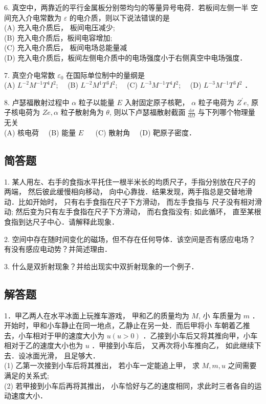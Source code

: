 6. 真空中，两靠近的平行金属板分别带均匀的等量异号电荷．若板间左侧一半 空间充入介电常数为 $\varepsilon$ 的电介质，则以下说法错误的是 \\
(A) 充入电介质后， 板间电压减少;\\
(B) 充入电介质后，板间电容增加;\\
(C) 充入电介质后， 板间电场总能量减\\
(D) 充入电介质后，板间左侧电介质中的电场强度小于右侧真空中电场强度．

7. 真空介电常数 $\varepsilon_{0}$ 在国际单位制中的量纲是\\
(A) $L^{-2} M^{-1} T^{4} I^{2}$;$\quad$
(B) $L^{-2} M^{1} T^{3} I^{2}$;$\quad$
(C) $L^{-3} M^{-1} T^{4} I^{2}$;$\quad$
(D) $L^{-3} M^{-1} T^{3} I^{2}$ ．

8. 卢瑟福散射过程中 $\alpha$ 粒子以能量 $E$ 入射固定原子核靶， $\alpha$ 粒子电荷为 $Z^{\prime} e$, 原子核电荷为 $Z e, \alpha$ 粒子散射角为 $\theta$, 则以下卢瑟福散射截面 $\frac{\mathrm{d} \sigma}{\mathrm{d} \Omega}$ 与下列哪个物理量无关\\
(A) 核电荷$\quad$
(B) 能量 $E$ $\quad$
(C) 散射角$\quad$
(D) 靶原子密度．
\subsection{简答题}
1.  某人用左、右手的食指水平托住一根半米长的均质尺子，手指分别放在尺子的两端， 然后彼此缓慢相向移动， 向中心靠拢．结果发现，两手指总是交替地滑动．比如开始时， 只有右手食指在尺子下方滑动， 而左手食指与 尺子没有相对滑动; 然后变为只有左手食指在尺子下方滑动， 而右食指没有; 如此循环， 直至某根食指到达尺子中心．请解释此现象．

2. 空间中存在随时间变化的磁场，但不存在任何导体．该空间是否有感应电场？有没有感应电动势？并简述理由．

3. 什么是双折射现象？并给出现实中双折射现象的一个例子．
\subsection{解答题}
1．甲乙两人在水平冰面上玩推车游戏， 甲和乙的质量均为 $M$, 小 车质量为 $m$ ．开始时，甲和小车静止在同一地点，乙静止在另一处．而后甲将小 车朝着乙推去，小车相对于甲的速度大小为 $u(u>0)$ ．乙接到小车后又将其推向甲，小车相对于乙的速度大小也为 $u$ ．甲接到小车后， 又再次将小车推向乙， 如此继续下去．设冰面光滑， 且足够大．\\
(1) 乙第一次接到小车后将其推出， 若小车一定能追上甲， 求 $M, m, u$ 之间需要满足的关系式;\\
(2) 若甲接到小车后再将其推出， 小车恰好与乙的速度相同，求此时三者各自的运动速度大小．

